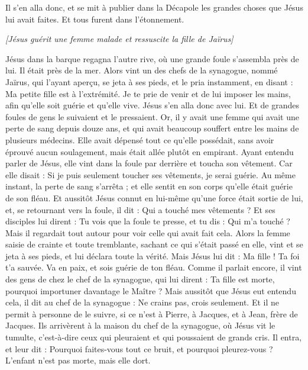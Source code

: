 \begin{multicols}{2}
Il s'en alla donc, et se mit à publier dans la Décapole les grandes choses que Jésus lui avait faites. Et tous furent dans l’étonnement.
\begin{center}
\textit{[Jésus guérit une femme malade et ressuscite la fille de Jaïrus]}
\end{center}
\PPE{}
Jésus dans la barque regagna l’autre rive, où une grande foule s’assembla près de lui. Il était près de la mer.
Alors vint un des chefs de la synagogue, nommé Jaïrus, qui l’ayant aperçu, se jeta à ses pieds,
et le pria instamment, en disant : Ma petite fille est à l'extrémité. Je te prie de venir et de lui imposer les mains, afin qu'elle soit guérie et qu'elle vive.
Jésus s'en alla donc avec lui. Et de grandes foules de gens le suivaient et le pressaient.
Or, il y avait une femme qui avait une perte de sang depuis douze ans,
et qui avait beaucoup souffert entre les mains de plusieurs médecins. Elle avait dépensé tout ce qu’elle possédait, sans avoir éprouvé aucun soulagement, mais était allée plutôt en empirant.
Ayant entendu parler de Jésus, elle vint dans la foule par derrière et toucha son vêtement.
Car elle disait : Si je puis seulement toucher ses vêtements, je serai guérie.
Au même instant, la perte de sang s'arrêta ; et elle sentit en son corps qu'elle était guérie de son fléau.
Et aussitôt Jésus connut en lui-même qu’une force était sortie de lui, et, se retournant vers la foule, il dit : Qui a touché mes vêtements ?
Et ses disciples lui dirent : Tu vois que la foule te presse, et tu dis : Qui m'a touché ?
Mais il regardait tout autour pour voir celle qui avait fait cela.
Alors la femme saisie de crainte et toute tremblante, sachant ce qui s’était passé en elle, vint et se jeta à ses pieds, et lui déclara toute la vérité.
Mais Jésus lui dit : Ma fille ! Ta foi t'a sauvée. Va en paix, et sois guérie de ton fléau.
Comme il parlait encore, il vint des gens de chez le chef de la synagogue, qui lui dirent : Ta fille est morte, pourquoi importuner davantage le Maître ?
Mais aussitôt que Jésus eut entendu cela, il dit au chef de la synagogue : Ne crains pas, crois seulement.
Et il ne permit à personne de le suivre, si ce n’est à Pierre, à Jacques, et à Jean, frère de Jacques.
Ils arrivèrent à la maison du chef de la synagogue, où Jésus vit le tumulte, c'est-à-dire ceux qui pleuraient et qui poussaient de grands cris.
Il entra, et leur dit : Pourquoi faites-vous tout ce bruit, et pourquoi pleurez-vous ? L’enfant n'est pas morte, mais elle dort.

\end{multicols}
